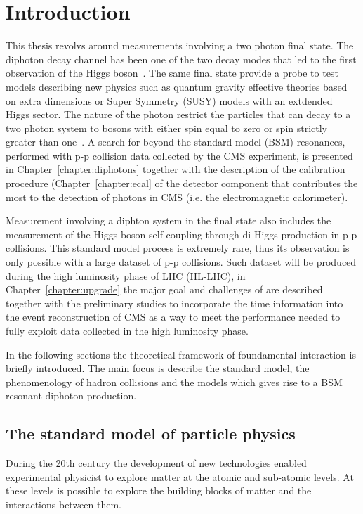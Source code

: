 \chapter{Introduction}
\label{sec:introduction}

This thesis revolvs around measurements involving a two photon final state.
The diphoton decay channel has been one of the two decay modes that led to the
first observation of the Higgs boson~\cite{cms_atlas_hgg_comb}. The same
final state provide a probe to test models describing new physics such as quantum gravity
effective theories based on extra dimensions or Super Symmetry (SUSY) models with an extdended
Higgs sector. The nature of the photon restrict the
particles that can decay to a two photon system to bosons with either
spin equal to zero or spin strictly greater than one~\cite{landau,yang}.
A search for beyond the standard model (BSM) resonances, performed with p-p collision data collected by the CMS experiment,
is presented in Chapter~\ref{chapter:diphotons} together with the description of the calibration procedure (Chapter~\ref{chapter:ecal}
of the detector component that contributes the most to the detection of photons in CMS (i.e. the electromagnetic calorimeter).

Measurement involving a diphton system in the final state also includes the measurement of the Higgs boson self coupling
through di-Higgs production in p-p collisions. This standard model process is extremely rare, thus its observation is
only possible with a large dataset of p-p collisions. Such dataset will be produced during the high luminosity
phase of LHC (HL-LHC), in Chapter~\ref{chapter:upgrade} the major goal and challenges of are described together with
the preliminary studies to incorporate the time information into the event reconstruction of CMS as a way to meet
the performance needed to fully exploit data collected in the high luminosity phase.

In the following sections the theoretical framework of foundamental interaction is briefly introduced.
The main focus is describe the standard model, the phenomenology of hadron collisions and the models
which gives rise to a BSM resonant diphoton production.

\section{The standard model of particle physics}
During the 20th century the development of new technologies enabled experimental
physicist to explore matter at the atomic and sub-atomic levels. At these levels
is possible to explore the building blocks of matter and the interactions between them.

